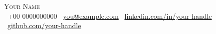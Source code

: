 \begin{center}
    {\Huge\scshape Your Name}\\[3pt]
    \small
    \faPhone*~+00-0000000000 \quad
    \faEnvelope~\href{mailto:you@example.com}{you@example.com} \quad
    \faLinkedin~\href{https://linkedin.com/in/your-handle}{linkedin.com/in/your-handle} \quad
    \faGithub~\href{https://github.com/your-handle}{github.com/your-handle}
\end{center}
\vspace{-4pt}
